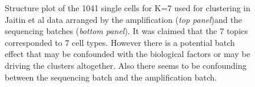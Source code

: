 \begin{figure}[ht]
\begin{subfigure}[t]{1\textwidth}
          \vspace{-1in}  \qquad  \qquad 
    \end{subfigure}      
    \vspace{-1in} 
    \caption{Structure plot of the 1041 single cells for K=7 used for clustering in Jaitin et al data \cite{Jaitin2015} arranged by the amplification (\textit{top panel})and the sequencing batches (\textit{bottom panel}). It was claimed that the $7$ topics corresponded to $7$ cell types. However there is a potential batch effect that may be confounded with the biological factors or may be driving the clusters altogether. Also there seems to be confounding between the sequencing batch and the amplification batch.}
    \end{figure}

